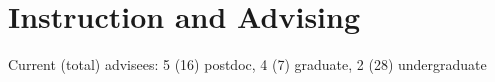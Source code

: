 \documentclass[letterpaper,10pt]{article}
\renewenvironment{itemize}{
  \begin{list}{}{
    \setlength{\leftmargin}{1.5em}
  }
}{
  \end{list}
}
\begin{document}
\section*{Instruction and Advising}
\begin{itemize}
\setlength\itemsep{0ex}
\item Current (total) advisees: 5 (16) postdoc, 4 (7) graduate, 2 (28) undergraduate




\end{itemize}
\end{document}
